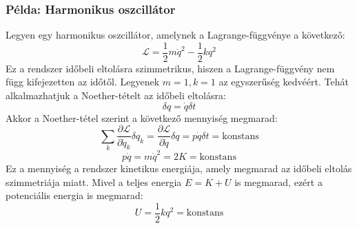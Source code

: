 \documentclass[a4paper,12pt]{article}
\begin{document}
\subsubsection*{Példa: Harmonikus oszcillátor}
Legyen egy harmonikus oszcillátor, amelynek a Lagrange-függvénye a következő:
\begin{equation}
    \mathcal{L} = \frac{1}{2}m \dot{q}^2 - \frac{1}{2}k q^2
\end{equation}
Ez a rendszer időbeli eltolásra szimmetrikus, hiszen a Lagrange-függvény nem függ kifejezetten az időtől. Legyenek $m = 1, k=1$ az egyszerűség kedvéért. Tehát alkalmazhatjuk a Noether-tételt az időbeli eltolásra:
\begin{equation}
    \delta q = \dot{q} \delta t
\end{equation}
Akkor a Noether-tétel szerint a következő mennyiség megmarad:
\begin{equation}
    \sum_k \frac{\partial \mathcal{L}}{\partial \dot{q}_k} \delta q_k = \frac{\partial \mathcal{L}}{\partial \dot{q}} \delta q = p \dot{q} \delta t = \text{konstans}
\end{equation}
\begin{equation}
    p \dot{q} = m \dot{q}^2 = 2K = \text{konstans}
\end{equation}
Ez a mennyiség a rendszer kinetikus energiája, amely megmarad az időbeli eltolás szimmetriája miatt. Mivel a teljes energia $E = K + U$ is megmarad, ezért a potenciális energia is megmarad:
\begin{equation}
    U = \frac{1}{2}k q^2 = \text{konstans}
\end{equation}
\end{document}
